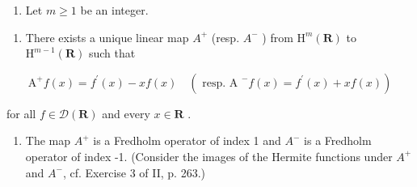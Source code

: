 \begin{enumerate}
\def\labelenumi{\arabic{enumi})}
\setcounter{enumi}{32}
\tightlist
\item
  Let \(m \geqslant 1\) be an integer.
\end{enumerate}

\begin{enumerate}
\def\labelenumi{\alph{enumi})}
\tightlist
\item
  There exists a unique linear map \(A^{+}\) (resp. \(A^{-}\) ) from \(\mathrm{H}^{m}(\mathbf{R})\) to \(\mathrm{H}^{m-1}(\mathbf{R})\) such that
\end{enumerate}

\[
\mathrm{A} ^ {+} f (x) = f ^ {\prime} (x) - x f (x) \quad (\text { resp.   A } ^ {-} f (x) = f ^ {\prime} (x) + x f (x))
\]

for all \(f \in \mathcal{D}(\mathbf{R})\) and every \(x \in \mathbf{R}\) .

\begin{enumerate}
\def\labelenumi{\alph{enumi})}
\setcounter{enumi}{1}
\tightlist
\item
  The map \(A^{+}\) is a Fredholm operator of index 1 and \(A^{-}\) is a Fredholm operator of index -1. (Consider the images of the Hermite functions under \(A^{+}\) and \(A^{-}\), cf. Exercise 3 of II, p. 263.)
\end{enumerate}